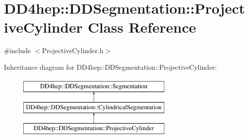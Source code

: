 \hypertarget{class_d_d4hep_1_1_d_d_segmentation_1_1_projective_cylinder}{}\section{D\+D4hep\+:\+:D\+D\+Segmentation\+:\+:Projective\+Cylinder Class Reference}
\label{class_d_d4hep_1_1_d_d_segmentation_1_1_projective_cylinder}


{\ttfamily \#include $<$Projective\+Cylinder.\+h$>$}

Inheritance diagram for D\+D4hep\+:\+:D\+D\+Segmentation\+:\+:Projective\+Cylinder\+:\begin{figure}[H]
\begin{center}
\leavevmode
\includegraphics[height=3.000000cm]{class_d_d4hep_1_1_d_d_segmentation_1_1_projective_cylinder}
\end{center}
\end{figure}
